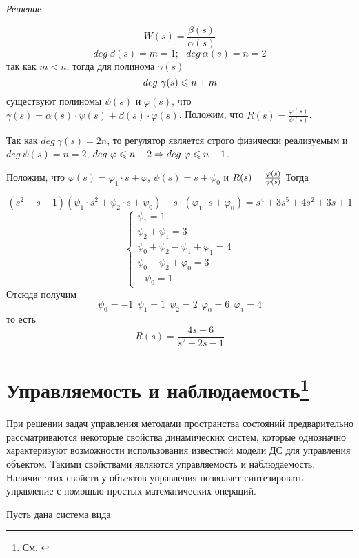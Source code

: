 \documentclass[../../TAU.tex]{subfiles}
\begin{document}
    \textit{Решение}
    {
        $$
            W(s)=\frac{\beta(s)}{\alpha(s)}
        $$
        $$
            deg\ \beta(s)=m=1;\ \ \ deg\ \alpha(s)=n=2
        $$
        так как $m<n$, тогда для полинома $\gamma(s)$
        $$
            deg\ \gamma(s)\leqslant n+m
        $$
        существуют полиномы $\psi(s)$ и $\varphi(s)$, что $\gamma(s)=\alpha(s)\cdot\psi(s)+\beta(s)\cdot\varphi(s)$.
        Положим, что $R(s)=\frac{\varphi(s)}{\psi(s)}$.


        Так как $deg\ \gamma(s)=2n$, то регулятор является строго физически реализуемым и $deg\ \psi(s)=n=2$, $deg\ \varphi\lse n-2\Rightarrow deg\ \varphi\lse n-1$.

        Положим, что $\varphi(s)=\varphi_1\cdot s+\varphi$, $\psi(s)=s+\psi_0$ и 
        $R(s)={\varphi(s)\over\psi(s)}$
        Тогда

        $$
            (s^2+s-1)(\psi_1\cdot s^2+\psi_2\cdot s+\psi_0)+s\cdot(\varphi_1\cdot s+\varphi_0)=s^4+3s^5+4s^2+3s+1
        $$
        $$
        \begin{cases}
            \psi_1=1\\
            \psi_2+\psi_1=3\\
            \psi_0+\psi_2-\psi_1+\varphi_1=4\\
            \psi_0-\psi_2+\varphi_0=3\\
            -\psi_0=1
        \end{cases}
        $$
        Отсюда получим
        $$
        \psi_0=-1\ \ \psi_1=1\ \ \psi_2=2\ \ \varphi_0=6\ \ \varphi_1=4
        $$
        то есть
        $$
            R(s)=\frac{4s+6}{s^2+2s-1}
        $$
    }



\section[Управляемость и наблюдаемость]{Управляемость и наблюдаемость\footnote{См. \cite[стр. 269]{voron}}}

    При решении задач управления методами пространства состояний предварительно рассматриваются некоторые свойства динамических систем, которые однозначно характеризуют возможности использования известной модели ДС для управления объектом. 
    Такими свойствами являются управляемость и наблюдаемость. 
    Наличие этих свойств у объектов управления позволяет синтезировать управление с помощью простых математических операций.
    \cite[стр. 62]{yashin} 

    Пусть дана система вида
\end{document}
